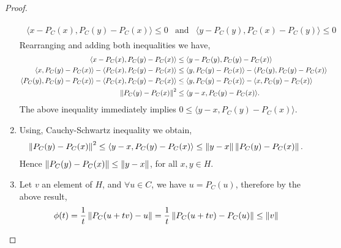 \begin{lemma}
\begin{proof}
\begin{enumerate}
		\begin{align*}
			\begin{array}{ccc}
			\langle x-P_C(x), P_C(y)-P_C(x)\rangle \leq 0 & \text{and}
			&\langle y-P_C(y), P_C(x)-P_C(y)\rangle \leq 0
			\end{array}			
		\end{align*}
		Rearranging and adding both inequalities we have,
		\begin{align*}
		\langle x-P_C(x), P_C(y)-P_C(x)\rangle &\leq 
		\langle y-P_C(y), P_C(y)-P_C(x)\rangle \\
		\langle x, P_C(y)-P_C(x)\rangle -\langle P_C(x), P_C(y)-P_C(x)\rangle&\leq \langle y, P_C(y)-P_C(x)\rangle -\langle P_C(y), P_C(y)-P_C(x)\rangle \\
		\langle P_C(y), P_C(y)-P_C(x)\rangle -\langle P_C(x), P_C(y)-P_C(x)\rangle&\leq \langle y, P_C(y)-P_C(x)\rangle -\langle x, P_C(y)-P_C(x)\rangle \\
		\left\lVert P_C(y)-P_C(x)\right\rVert^2&\leq \langle y-x, P_C(y)-P_C(x)\rangle.
		\end{align*}
		The above inequality immediately implies $0\leq \langle y-x, P_C(y)-P_C(x)\rangle$.
		\item Using, Cauchy-Schwartz inequality we obtain,
		\begin{align*}
		\left\lVert P_C(y)-P_C(x)\right\rVert^2\leq \langle y-x, P_C(y)-P_C(x)\rangle\leq \left\lVert y-x\right\rVert \left\lVert P_C(y)-P_C(x)\right\rVert.
		\end{align*}
		Hence $\left\lVert P_C(y)-P_C(x)\right\rVert\leq \left\lVert y-x\right\rVert$, for all $x,y \in H$.
		\item Let $v$ an element of $H$, and $\forall u \in C$, we have $u=P_C(u)$, therefore by the above result,
		\[
			\phi(t)=\frac{1}{t}\left\lVert P_C(u+tv)-u\right\rVert=\frac{1}{t}\left\lVert P_C(u+tv)-P_C(u)\right\rVert \leq \left\lVert v\right\rVert
		\]
		
	\end{enumerate}
\end{proof}
\end{lemma}
